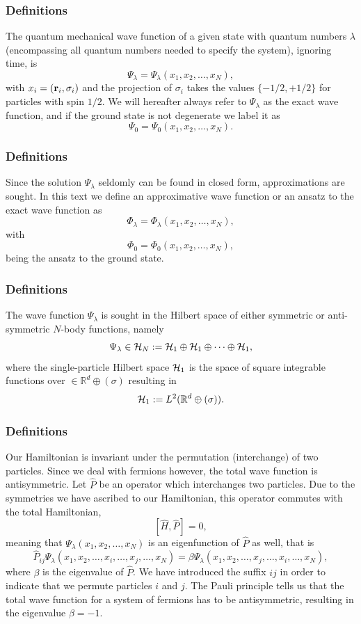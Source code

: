 \frame
{
\frametitle{Definitions}
The quantum mechanical wave function of a given state with quantum numbers $\lambda$ (encompassing all quantum numbers needed to specify the system), ignoring time, is
\[
\Psi_{\lambda}=\Psi_{\lambda}(x_1,x_2,\dots,x_N),
\]
with $x_i=({\bf r}_i,\sigma_i)$ and the projection of $\sigma_i$ takes the values
$\{-1/2,+1/2\}$ for particles with spin $1/2$. 
We will hereafter always refer to $\Psi_{\lambda}$ as the exact wave function, and if the ground state is not degenerate we label it as 
\[
\Psi_0=\Psi_0(x_1,x_2,\dots,x_N).
\]

}


\frame
{
\frametitle{Definitions}
Since the solution $\Psi_{\lambda}$ seldomly can be found in closed form, approximations are sought. In this text we define an approximative wave function or an ansatz to the exact wave function as 
\[
\Phi_{\lambda}=\Phi_{\lambda}(x_1,x_2,\dots,x_N),
\]
with 
\[
\Phi_0=\Phi_0(x_1,x_2,\dots,x_N),
\]
being the ansatz to the ground state.  
}


\frame
{
\frametitle{Definitions}
The wave function $\Psi_{\lambda}$ is sought in the Hilbert space of either symmetric or anti-symmetric $N$-body functions, namely
\[
\Psi_{\lambda}\in {\cal H}_N:= {\cal H}_1\oplus{\cal H}_1\oplus\dots\oplus{\cal H}_1,
\]
where the single-particle Hilbert space ${\cal H}_1$ is the space of square integrable functions over
$\in {\mathbb{R}}^{d}\oplus (\sigma)$
resulting in
\[
{\cal H}_1:= L^2(\mathbb{R}^{d}\oplus (\sigma)).
\]
}



\frame
{
\frametitle{Definitions}
Our Hamiltonian is invariant under the permutation (interchange) of two particles.
Since we deal with fermions however, the total wave function is antisymmetric.
Let $\hat{P}$ be an operator which interchanges two particles.
Due to the symmetries we have ascribed to our Hamiltonian, this operator commutes with the total Hamiltonian,
\[
[\hat{H},\hat{P}] = 0,
\]
meaning that $\Psi_{\lambda}(x_1, x_2, \dots , x_N)$ is an eigenfunction of 
$\hat{P}$ as well, that is
\[
\hat{P}_{ij}\Psi_{\lambda}(x_1, x_2, \dots,x_i,\dots,x_j,\dots,x_N)=
\beta\Psi_{\lambda}(x_1, x_2, \dots,x_j,\dots,x_i,\dots,x_N),
\]
where $\beta$ is the eigenvalue of $\hat{P}$. We have introduced the suffix $ij$ in order to indicate that we permute particles $i$ and $j$.
The Pauli principle tells us that the total wave function for a system of fermions
has to be antisymmetric, resulting in the eigenvalue $\beta = -1$.   

}

